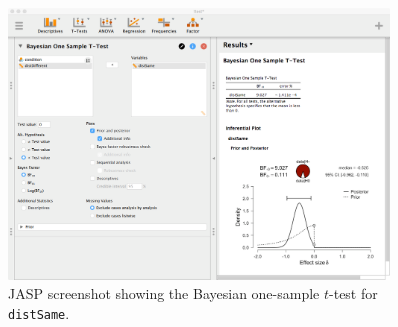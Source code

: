 \documentclass[english,,doc,floatsintext]{apa6}
\begin{document}
\begin{figure}
\centering
\includegraphics[width=0.9\textwidth,height=\textheight]{figures/ttestBayes.png}
\caption{\label{fig:ttestBayes}JASP screenshot showing the Bayesian one-sample \(t\)-test for \texttt{distSame}.}
\end{figure}
\end{document}
